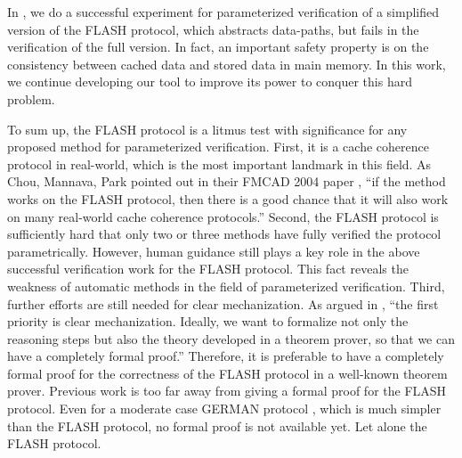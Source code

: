 \documentclass{llncs-new}
\begin{document}
In \cite{liatva2015}, we do a successful experiment for parameterized verification of a simplified version of the FLASH protocol, which abstracts   data-paths, but fails in the verification of the full version. In fact, an important safety property is on the consistency between cached data and  stored data in main memory. In this work, we continue developing our tool to improve its power to conquer this hard problem.


To sum up,  the FLASH protocol is a litmus test with significance for any proposed method for parameterized verification. First, it is a cache coherence protocol in real-world, which is  the most important landmark in this field.  As Chou, Mannava, Park pointed out in their FMCAD 2004 paper \cite{Chou2004}, ``if the method works on the FLASH protocol, then there is a good chance that it will also work on many real-world cache coherence protocols.'' Second,
the FLASH protocol is  sufficiently hard that only two or three methods have  fully verified
the protocol parametrically. However, human guidance still plays a key role in the above successful verification work for the FLASH protocol. This fact reveals  the weakness of automatic methods in the field of parameterized verification.  Third, further  efforts are still needed for clear mechanization. As argued in \cite{Chou2004}, ``the first priority is clear mechanization. Ideally, we want to formalize not only the reasoning
steps  but also the theory developed in a theorem
prover, so that we can have a completely formal proof.'' Therefore, it is preferable to  have a completely formal proof for the correctness of the  FLASH protocol in a well-known theorem prover. Previous work is too far away from giving a formal proof for the FLASH protocol. Even for a moderate case GERMAN protocol \cite{Arons2001}, which is much simpler than the FLASH protocol, no formal proof is not available yet. Let alone the FLASH protocol.
\end{document}
